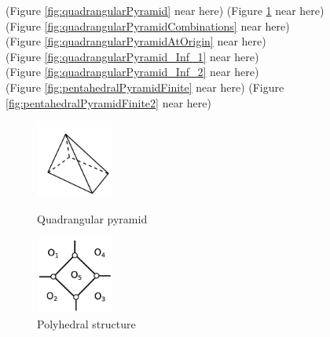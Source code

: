 \documentclass[suppldata, dvipdfmx]{interact}
\theoremstyle{plain}%
\theoremstyle{definition}
\theoremstyle{remark}
\theoremstyle{problemstyle}
\begin{document}
\noindent(Figure \ref{fig:quadrangularPyramid} near here)
(Figure \ref{fig:quadrangularPyramidFaces} near here)\\
(Figure \ref{fig:quadrangularPyramidCombinations}
 near here)\\
(Figure \ref{fig:quadrangularPyramidAtOrigin} near here)\\
(Figure \ref{fig:quadrangularPyramid_Inf_1}
 near here)\\
(Figure \ref{fig:quadrangularPyramid_Inf_2}
 near here)\\
(Figure \ref{fig:pentahedralPyramidFinite}
 near here)
(Figure \ref{fig:pentahedralPyramidFinite2}
 near here)


\begin{figure}[h!tbp]
  \begin{minipage}[t]{0.5\textwidth}
   \centering
   \includegraphics[width=1in, keepaspectratio]{./img/HexahedraWithSphericalFaces/pentahedralPyramid/pyramid.jpg}
   \caption{Quadrangular pyramid}
   \label{fig:quadrangularPyramid}
  \end{minipage}
 \hspace*{\fill}
  \begin{minipage}[t]{0.5\textwidth}
   \centering
   \includegraphics[width=1in, keepaspectratio]{./img/HexahedraWithSphericalFaces/pentahedralPyramid/faces.jpg}
   \caption{Polyhedral structure}
   \label{fig:quadrangularPyramidFaces}
  \end{minipage}
 \hspace*{\fill}
\end{figure}
\end{document}
